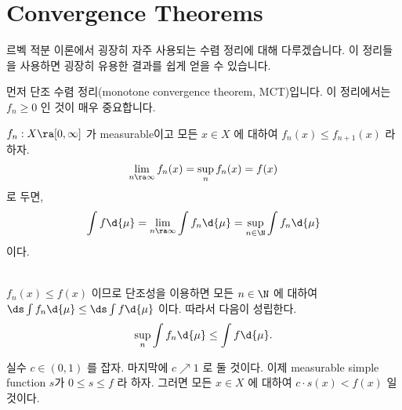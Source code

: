 \begin{center}
\end{center}

\section*{Convergence Theorems}

르벡 적분 이론에서 굉장히 자주 사용되는 수렴 정리에 대해 다루겠습니다. 이 정리들을 사용하면 굉장히 유용한 결과를 쉽게 얻을 수 있습니다.

먼저 단조 수렴 정리(monotone convergence theorem, MCT)입니다. 이 정리에서는 \(f_n \geq 0\) 인 것이 매우 중요합니다.

  \(f_n: X \ra [0, \infty]\) 가 measurable이고 모든 \(x \in X\) 에 대하여 \(f_n(x) \leq f_{n+1}(x)\) 라 하자. \[
    \lim_{n\ra\infty} f_n(x) = \sup_{n} f_n(x) = f(x)
\]
로 두면,
\[
    \int f \d{\mu} = \lim_{n\ra\infty} \int f_n \d{\mu} = \sup_{n \in \N} \int f_n \d{\mu}
\]
이다.

\pf \\
\note{\(\geq\)} \(f_n(x) \leq f(x)\) 이므로 단조성을 이용하면 모든 \(n \in \N\) 에 대하여 \(\ds \int f_n \d{\mu} \leq \ds \int f \d{\mu}\) 이다. 따라서 다음이 성립한다.
\[
    \sup_n \int f_n \d{\mu} \leq \int f \d{\mu}.
\]

\note{\(\leq\)} 실수 \(c \in (0, 1)\) 를 잡자. 마지막에 \(c \nearrow 1\) 로 둘 것이다. 이제 measurable simple function \(s\)가 \(0 \leq s \leq f\) 라 하자. 그러면 모든 \(x \in X\) 에 대하여 \(c \cdot s(x) < f(x)\) 일 것이다.

